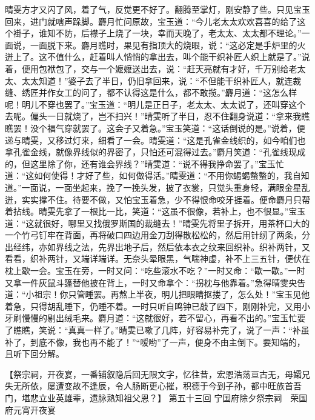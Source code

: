 \documentclass[12pt,oneside]{book}
\begin{document}
晴雯方才又闪了风，着了气，反觉更不好了。翻腾至掌灯，刚安静了些。只见宝玉回来，进门就嗐声跺脚。麝月忙问原故，宝玉道：“今儿老太太欢欢喜喜的给了这个褂子，谁知不防，后襟子上烧了一块，幸而天晚了，老太太、太太都不理论。”一面说，一面脱下来。麝月瞧时，果见有指顶大的烧眼，说：“这必定是手炉里的火迸上了。这不值什么，赶着叫人悄悄的拿出去，叫个能干织补匠人织上就是了。”说着，便用包袱包了，交与一个嬷嬷送出去，说：“赶天亮就有才好，千万别给老太太、太太知道！”婆子去了半日，仍旧拿回来，说：“不但能干织补匠人，就连裁缝、绣匠并作女工的问了，都不认得这是什么，都不敢揽。”麝月道：“这怎么样呢！明儿不穿也罢了。”宝玉道：“明儿是正日子，老太太、太太说了，还叫穿这个去呢。偏头一日就烧了，岂不扫兴！”晴雯听了半日，忍不住翻身说道：“拿来我瞧瞧罢！没个福气穿就罢了。这会子又着急。”宝玉笑道：“这话倒说的是。”说着，便递与晴雯，又移过灯来，细看了一会。晴雯道：“这是孔雀金线织的，如今咱们也拿孔雀金线，就像界线似的界密了，只怕还可混得过去。”麝月笑道：“孔雀线现成的，但这里除了你，还有谁会界线？”晴雯道：“说不得我挣命罢了。”宝玉忙道：“这如何使得！才好了些，如何做得活。”晴雯道：“不用你蝎蝎螫螫的，我自知道。”一面说，一面坐起来，挽了一挽头发，披了衣裳，只觉头重身轻，满眼金星乱迸，实实撑不住。待要不做，又怕宝玉着急，少不得恨命咬牙捱着。便命麝月只帮着拈线。晴雯先拿了一根比一比，笑道：“这虽不很像，若补上，也不很显。”宝玉道：“这就很好，哪里又找俄罗斯国的裁缝去！”晴雯先将里子拆开，用茶杯口大的一个竹弓钉牢在背面，再将破口四边用金刀刮得散松松的，然后用针纫了两条，分出经纬，亦如界线之法，先界出地子后，然后依本衣之纹来回织补。织补两针，又看看，织补两针，又端详端详。无奈头晕眼黑，气喘神虚，补不上三五针，便伏在枕上歇一会。宝玉在旁，一时又问：“吃些滚水不吃？”一时又命：“歇一歇。”一时又拿一件灰鼠斗篷替他披在背上，一时又命拿个：“拐枕与他靠着。”急得晴雯央告道：“小祖宗！你只管睡罢。再熬上半夜，明儿把眼睛抠搂了，怎么处！”宝玉见他着急，只得胡乱睡下，仍睡不着。一时只听自鸣钟已敲了四下，刚刚补完，又用小牙刷慢慢的剔出绒毛来。麝月道：“这就很好，若不留心，再看不出的。”宝玉忙要了瞧瞧，笑说：“真真一样了。”晴雯已嗽了几阵，好容易补完了，说了一声：“补虽补了，到底不像，我也再不能了！”“嗳哟”了一声，便身不由主倒下。要知端的，且听下回分解。






 
【祭宗祠，开夜宴，一番铺叙隐后回无限文字，忆往昔，宏恩浩荡亘古无，母孀兄失无所依，屡遭变故不逢辰，令人肠断更心摧，积德于今到子孙，都中旺族首吾门，堪悲立业英雄辈，遗脉熟知祖父恩？】
第五十三回  宁国府除夕祭宗祠　荣国府元宵开夜宴
\end{document}
